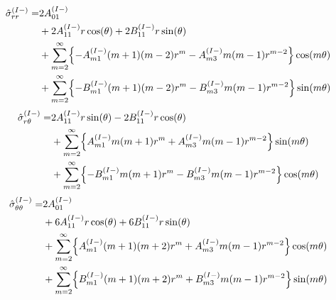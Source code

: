 \begin{align}
	\hat{\sigma}_{rr}^{(I-)} =&2A_{01}^{(I-)}
	\nonumber
	\\
	&+2A_{11}^{(I-)}r\cos(\theta)
	+2B_{11}^{(I-)}r\sin(\theta)
	\nonumber
	\\
	&+\sum_{m=2}^{\infty}\Bigl\{-A_{m1}^{(I-)}(m+1)(m-2)r^{m}
	-A_{m3}^{(I-)}m(m-1)r^{m-2}\Bigr\}\cos(m\theta)
	\nonumber
	\\
	&+\sum_{m=2}^{\infty}\Bigl\{-B_{m1}^{(I-)}(m+1)(m-2)r^{m}
	-B_{m3}^{(I-)}m(m-1)r^{m-2}\Bigr\}\sin(m\theta)
	\label{eq:SigmaRRIn1}
\end{align}
\begin{align}
	\hat{\sigma}_{r\theta}^{(I-)} =
	&2A_{11}^{(I-)}r\sin(\theta)
	-2B_{11}^{(I-)}r\cos(\theta)
	\nonumber
	\\
	&+\sum_{m=2}^{\infty}\Bigl\{A_{m1}^{(I-)}m(m+1)r^{m}
	+A_{m3}^{(I-)}m(m-1)r^{m-2}\Bigr\}\sin(m\theta)
	\nonumber
	\\
	&+\sum_{m=2}^{\infty}\Bigl\{-B_{m1}^{(I-)}m(m+1)r^{m}
	-B_{m3}^{(I-)}m(m-1)r^{m-2}\Bigr\}\cos(m\theta)
	\label{eq:SigmaRThIn1}
\end{align}
\begin{align}
	\hat{\sigma}_{\theta\theta}^{(I-)} =&2A_{01}^{(I-)}
	\nonumber
	\\
	&+6A_{11}^{(I-)}r\cos(\theta)+6B_{11}^{(I-)}r\sin(\theta)
	\nonumber
	\\
	&+\sum_{m=2}^{\infty}\Bigl\{A_{m1}^{(I-)}(m+1)(m+2)r^{m}
	+A_{m3}^{(I-)}m(m-1)r^{m-2}\Bigr\}\cos(m\theta)
	\nonumber
	\\
	&+\sum_{m=2}^{\infty}\Bigl\{B_{m1}^{(I-)}(m+1)(m+2)r^{m}
	+B_{m3}^{(I-)}m(m-1)r^{m-2}\Bigr\}\sin(m\theta)
	\label{eq:SigmaThThIn1}
\end{align}

\newpage
